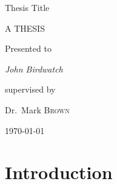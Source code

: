 \documentclass[12pt,letterpaper,english,fleqn,titlepage]{article}
\date{02/24/16}
\begin{document}

\doublespacing



\begin{titlepage}
	\centering
        \vspace*{-1cm}
	{\Large Thesis Title \par}
	\vspace{3cm}
	{\Large A THESIS \par}
	\vspace{.5cm}
	{Presented to \par}
	\vspace{2cm}
	{\Large\itshape John Birdwatch\par}
	\vfill
	supervised by\par
	Dr.~Mark \textsc{Brown}

	\vfill

	{\large \today\par}
\end{titlepage}


\begin{abstract}
\noindent Here comes your abstract.

This is a template for documents prepared with \LaTeX{} for the journal
Economics-The Open Access, Open Assessment E-Journal (www.economics-ejournal.org).

You find further instructions in the Introduction. Please read them.

\noindent \medskip{}


\noindent \emph{Keywords: }Insert the keywords here, separated by
commas.

\noindent \emph{Journal of Economic Literature Classification: }Insert
the classification numbers, such as \ J7, B54,\emph{ }etc. here\emph{.}
\end{abstract}


\newpage{}

\tableofcontents

\newpage

\section{Introduction}\label{intro}
\end{document}
